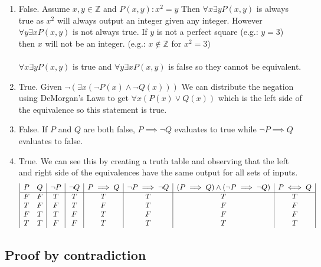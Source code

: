 \documentclass{article}
\begin{document}
\begin{enumerate}[label=(\alph*)]
    \item False. Assume \(x,y \in \mathbb{Z} \) and \( P(x,y): x^2=y \) Then \(\forall x \exists y P(x,y)\) is always true as \(x^2\) will always output an integer given any integer.
    However \(\forall y \exists x P(x,y)\) is not always true. If \(y\) is not a perfect square (e.g.: \(y=3\)) then \(x\) will not be an integer. (e.g.: \( x \notin \mathbb{Z} \) for \( x^2=3 \))
    \\\\
    \(\forall x \exists y P(x,y)\) is true and \(\forall y \exists x P(x,y)\) is false so they cannot be equivalent.
    
    \item True. Given \( \neg (\exists x(\neg P(x) \land \neg Q(x))) \) We can distribute the negation using DeMorgan's Laws to get \(\forall x (P(x) \lor Q(x))\) which is the left side of the equivalence so this statement is true.
    
    \item False. If \(P\) and \(Q\) are both false, \(P \implies \neg Q\) evaluates to true while \( \neg P \implies Q\) evaluates to false.
    
    \item True. We can see this by creating a truth table and observing that the left and right side of the equivalences have the same output for all sets of inputs.
        \begin{displaymath}
        \begin{array}{|c c|c|c|c|c|c|c|}
            P & Q & \neg P & \neg Q & P \implies Q & \neg P \implies \neg Q & (P \implies Q)\land (\neg P \implies \neg Q) & P \iff Q\\
            \hline
            F & F & T & T & T & T & T & T\\
            T & F & F & T & F & T & F & F\\
            F & T & T & F & T & F & F & F\\
            T & T & F & F & T & T & T & T
        \end{array}
        \end{displaymath}
    
    
\end{enumerate}

\newpage

\subsection{Proof by contradiction}
\end{document}
